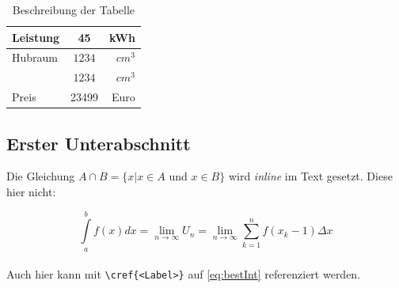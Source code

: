 \documentclass[BCOR=1cm, twoside, ngerman]{scrreprt}
\begin{document}
\begin{table}[h] %
\label{tab:beispieltabelle} %
\caption{Beschreibung der Tabelle}
\centering
  \begin{tabular}{|lc|r|}
    \hline
    Leistung & 45 & kWh \\
    \hline
    Hubraum & $1234$ & $cm^3$ \\
    \cline{3-3}
    & $1234$ & $cm^3$ \\
    Preis & 23499 & Euro \\
    \hline
  \end{tabular}
\end{table}

\subsection{Erster Unterabschnitt}
Die Gleichung $A \cap B = \{ x | x \in A$ und $x \in B \}$ wird \emph{inline} im Text gesetzt. Diese hier nicht:

\begin{equation}
  \int\limits_{a}^{b}f(x)dx
  = \lim\limits_{n\rightarrow \infty} U_{n}
  = \lim\limits_{n\rightarrow \infty} \sum\limits_{k=1}^{n}f(x_{k} -1)\Delta x
\label{eq:bestInt}
\end{equation}\\

Auch hier kann mit \texttt{\textbackslash cref\{<Label>\}} auf \cref{eq:bestInt} referenziert werden.

\printbibliography[heading=bibintoc, title={Literaturverzeichnis}]
\end{document}
